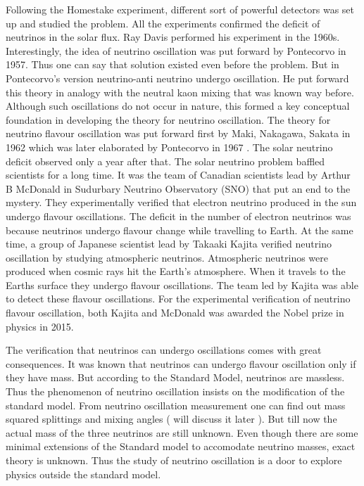 Following the Homestake experiment, different sort of powerful detectors was set up and studied the problem. All the experiments confirmed the deficit of neutrinos in the solar flux. Ray Davis performed his experiment in the 1960s. Interestingly, the idea of neutrino oscillation was put forward by Pontecorvo in 1957\cite{ponte57}. Thus one can say that solution existed even before the problem. But in Pontecorvo’s version neutrino-anti neutrino undergo oscillation. He put forward this theory in analogy with the neutral kaon mixing that was known way before. Although such oscillations do not occur in nature, this formed a key conceptual foundation in developing the theory for neutrino oscillation. The theory for neutrino flavour oscillation was put forward first by Maki, Nakagawa, Sakata in 1962 which was later elaborated by Pontecorvo in 1967 \cite{ponte68}. The solar neutrino deficit observed only a year after that. The solar neutrino problem baffled scientists for a long time. It was the team of Canadian scientists lead by Arthur B McDonald in Sudurbary Neutrino Observatory (SNO) that put an end to the mystery. They experimentally verified that electron neutrino produced in the sun undergo flavour oscillations. The deficit in the number of electron neutrinos was because neutrinos undergo flavour change while travelling to Earth\cite{mcdonald}. At the same time, a group of Japanese scientist lead by Takaaki Kajita verified neutrino oscillation by studying atmospheric neutrinos. Atmospheric neutrinos were produced when cosmic rays hit the Earth’s atmosphere. When it travels to the Earths surface they undergo flavour oscillations. The team led by Kajita was able to detect these flavour oscillations. For the experimental verification of neutrino flavour oscillation, both Kajita and McDonald was awarded the Nobel prize in physics in 2015.

The verification that neutrinos can undergo oscillations comes with great consequences. It was known that neutrinos can undergo flavour oscillation only if they have mass. But according to the Standard Model, neutrinos are massless. Thus the phenomenon of neutrino oscillation insists on the modification of the standard model. From neutrino oscillation measurement one can find out mass squared splittings and mixing angles ( will discuss it later ). But till now the actual mass of the three neutrinos are still unknown. Even though there are some minimal extensions of the Standard model to accomodate neutrino masses, exact theory is unknown. Thus the study of neutrino oscillation is a door to explore physics outside the standard model.